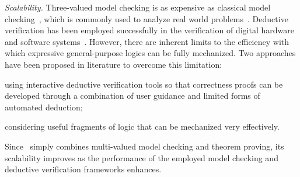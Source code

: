 \emph{Scalability.} Three-valued model checking is as expensive as classical model checking~\cite{bruns1999model}, which is commonly used to analyze real world problems~\cite{Woodcock:2009:FMP:1592434.1592436}.
Deductive verification has been employed successfully in the verification of digital hardware and software systems~\cite{rajan1995integration}.
However, there are inherent limits to the efficiency with which expressive general-purpose logics can be fully mechanized. 
Two approaches have been proposed in literature to overcome this limitation:
\begin{enumerate*}
\item  using interactive deductive verification tools so that correctness proofs can be developed through a combination of user guidance and limited forms of automated deduction;
\item considering useful fragments of logic that can be mechanized very effectively.
\end{enumerate*}
Since \NAME\ simply combines multi-valued model checking and theorem proving, its scalability improves  as the performance of the employed model checking and deductive verification  frameworks enhances.


